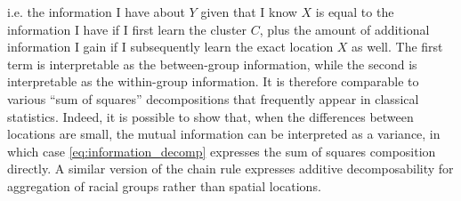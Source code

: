 	i.e. the information I have about $Y$ given that I know $X$ is equal to the information I have if I first learn the cluster $C$, plus the amount of additional information I gain if I subsequently learn the exact location $X$ as well. The first term is interpretable as the between-group information, while the second is interpretable as the within-group information. It is therefore comparable to various ``sum of squares'' decompositions that frequently appear in classical statistics. Indeed, it is possible to show that, when the differences between locations are small, the mutual information can be interpreted as a variance, in which case \eqref{eq:information_decomp} expresses the sum of squares composition directly. A similar version of the chain rule expresses additive decomposability for aggregation of racial groups rather than spatial locations. 

\color{gray} %

